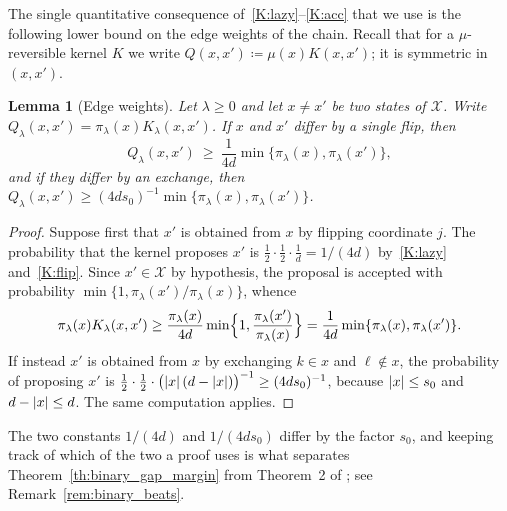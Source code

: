 \documentclass[aos]{imsart}%
\DeclarePairedDelimiter{\abs}{\lvert}{\rvert}
\newcommand{\ambientspace}[0]{\mathcal{X}}
\theoremstyle{plain}
\newtheorem{lemma}[theorem]{Lemma}
\theoremstyle{definition}
\begin{document}
    The single quantitative consequence of~\ref{K:lazy}--\ref{K:acc} that we
    use is the following lower bound on the edge weights of the chain. Recall
    that for a $\mu$-reversible kernel $K$ we write
    $Q(x,x')\coloneq\mu(x)K(x,x')$; it is symmetric in $(x,x')$.

    \begin{lemma}[Edge weights]
        \label{lemma:binary_edge}
        Let $\lambda\geq0$ and let $x\neq x'$ be two states of $\ambientspace$.
        Write $Q_\lambda(x,x')=\pi_\lambda(x)K_\lambda(x,x')$. If $x$ and $x'$
        differ by a single flip, then
        \begin{equation}
            \label{eq:binary_edge_flip}
            Q_\lambda(x,x')\ \geq\ \frac{1}{4d}
            \min\{\pi_\lambda(x),\pi_\lambda(x')\},
        \end{equation}
        and if they differ by an exchange, then
        $Q_\lambda(x,x')\geq(4ds_0)^{-1}\min\{\pi_\lambda(x),\pi_\lambda(x')\}$.
    \end{lemma}

    \begin{proof}
        Suppose first that $x'$ is obtained from $x$ by flipping coordinate
        $j$. The probability that the kernel proposes $x'$ is
        $\tfrac12\cdot\tfrac12\cdot\tfrac1d=1/(4d)$ by~\ref{K:lazy}
        and~\ref{K:flip}. Since $x'\in\ambientspace$ by hypothesis, the
        proposal is accepted with probability
        $\min\{1,\pi_\lambda(x')/\pi_\lambda(x)\}$, whence
        \begin{equation*}
            \pi_\lambda(x)K_\lambda(x,x')
            \geq\frac{\pi_\lambda(x)}{4d}
            \min\Bigl\{1,\frac{\pi_\lambda(x')}{\pi_\lambda(x)}\Bigr\}
            =\frac{1}{4d}\min\{\pi_\lambda(x),\pi_\lambda(x')\}.
        \end{equation*}
        If instead $x'$ is obtained from $x$ by exchanging $k\in x$ and
        $\ell\notin x$, the probability of proposing $x'$ is
        $\tfrac12\cdot\tfrac12\cdot\bigl(\abs{x}\,(d-\abs{x})\bigr)^{-1}
        \geq(4ds_0)^{-1}$, because $\abs x\leq s_0$ and $d-\abs x\leq d$. The
        same computation applies.
    \end{proof}

    The two constants $1/(4d)$ and $1/(4ds_0)$ differ by the factor $s_0$, and
    keeping track of which of the two a proof uses is what separates
    Theorem~\ref{th:binary_gap_margin} from Theorem~2 of
    \citet{YangWainwrightJordan2016}; see Remark~\ref{rem:binary_beats}.
\end{document}
